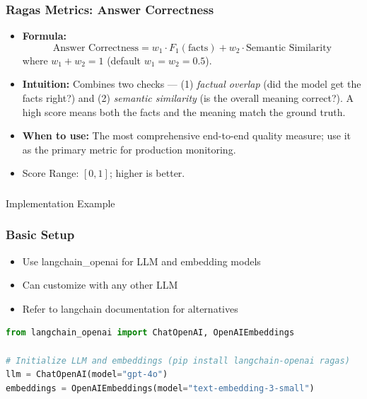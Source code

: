 \begin{frame}[fragile]
\frametitle{Ragas Metrics: Answer Correctness}
\begin{itemize}
    \item \textbf{Formula:}
    \[
      \text{Answer Correctness} = w_1 \cdot F_1(\text{facts}) + w_2 \cdot \text{Semantic Similarity}
    \]
    where $w_1 + w_2 = 1$ (default $w_1 = w_2 = 0.5$).
    \item \textbf{Intuition:} Combines two checks --- (1) \textit{factual overlap} (did the model get the facts right?) and (2) \textit{semantic similarity} (is the overall meaning correct?). A high score means both the facts and the meaning match the ground truth.
    \item \textbf{When to use:} The most comprehensive end-to-end quality measure; use it as the primary metric for production monitoring.
    \item Score Range: $[0, 1]$; higher is better.
\end{itemize}
\end{frame}


\begin{frame}[fragile]\frametitle{}
\begin{center}
{\Large Implementation Example}
\end{center}
\end{frame}

\begin{frame}[fragile]\frametitle{Basic Setup}

  \begin{itemize}
    \item Use langchain\_openai for LLM and embedding models
    \item Can customize with any other LLM
    \item Refer to langchain documentation for alternatives
  \end{itemize}

\begin{lstlisting}[language=Python]
from langchain_openai import ChatOpenAI, OpenAIEmbeddings

# Initialize LLM and embeddings (pip install langchain-openai ragas)
llm = ChatOpenAI(model="gpt-4o")
embeddings = OpenAIEmbeddings(model="text-embedding-3-small")
\end{lstlisting}


\end{frame}

